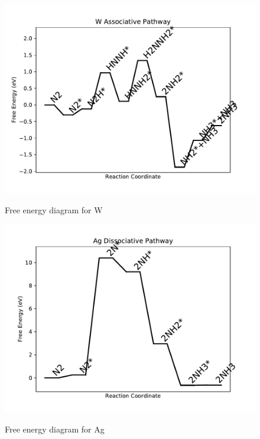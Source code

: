 \documentclass{article}
\begin{document}
\begin{figure}
\includegraphics[width=1\linewidth]{data/plots/W_associative.pdf}
\label{fig:W_associative}
\caption{Free energy diagram for W}
\end{figure}

\clearpage
\begin{figure}
\includegraphics[width=1\linewidth]{data/plots/Ag_dissociative.pdf}
\label{fig:Ag_dissociative}
\caption{Free energy diagram for Ag}
\end{figure}
\end{document}
